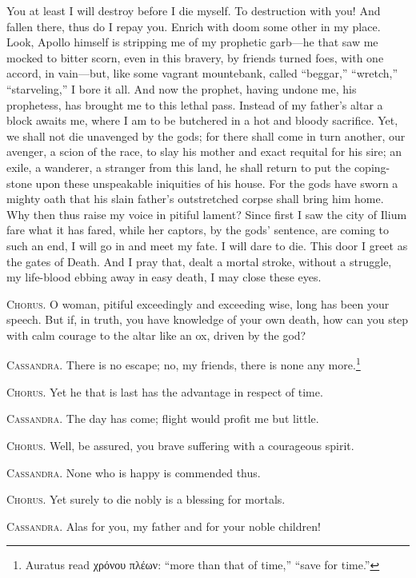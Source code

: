 \documentclass[12pt]{article}
\begin{document}
You at least I will destroy before I die myself. To destruction with you! And fallen there, thus do I repay you. Enrich with doom some other in my place. Look, Apollo himself is stripping me of my prophetic garb---he that saw me mocked to bitter scorn, even in this bravery, by friends turned foes, with one accord, in vain---but, like some vagrant mountebank, called ``beggar,'' ``wretch,'' ``starveling,'' I bore it all. And now the prophet, having undone me, his prophetess, has brought me to this lethal pass. Instead of my father's altar a block awaits me, where I am to be butchered in a hot and bloody sacrifice. Yet, we shall not die unavenged by the gods; for there shall come in turn another, our avenger, a scion of the race, to slay his mother and exact requital for his sire; an exile, a wanderer, a stranger from this land, he shall return to put the coping-stone upon these unspeakable iniquities of his house. For the gods have sworn a mighty oath that his slain father's outstretched corpse shall bring him home. Why then thus raise my voice in pitiful lament? Since first I saw the city of Ilium fare what it has fared, while her captors, by the gods' sentence, are coming to such an end, I will go in and meet my fate. I will dare to die. This door I greet as the gates of Death. And I pray that, dealt a mortal stroke, without a struggle, my life-blood ebbing away in easy death, I may close these eyes.

\textsc{Chorus.} O woman, pitiful exceedingly and exceeding wise, long has been your speech. But if, in truth, you have knowledge of your own death, how can you step with calm courage to the altar like an ox, driven by the god?

\textsc{Cassandra.} There is no escape; no, my friends, there is none any more.\footnote{Auratus read χρόνου πλέων: ``more than that of time,'' ``save for time.''}

\textsc{Chorus.} Yet he that is last has the advantage in respect of time.

\textsc{Cassandra.} The day has come; flight would profit me but little.

\textsc{Chorus.} Well, be assured, you brave suffering with a courageous spirit.

\textsc{Cassandra.} None who is happy is commended thus.

\textsc{Chorus.} Yet surely to die nobly is a blessing for mortals.

\textsc{Cassandra.} Alas for you, my father and for your noble children!
\end{document}
